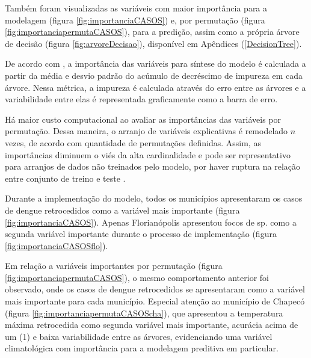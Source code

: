 \indent Também foram visualizadas as variáveis com maior importância para a modelagem (figura \ref{fig:importanciaCASOS}) e, por permutação (figura \ref{fig:importanciapermutaCASOS}), para a predição, assim como a própria árvore de decisão (figura \ref{fig:arvoreDecisao}), disponível em Apêndices (\ref{DecisionTree}).

\indent  De acordo com , a importância das variáveis para síntese do modelo  é calculada a partir da média e desvio padrão do acúmulo de decréscimo de impureza em cada árvore. Nessa métrica, a impureza é calculada através do erro entre as árvores e a variabilidade entre elas é representada graficamente como a barra de erro.

\indent Há maior custo computacional ao avaliar as importâncias das variáveis por permutação. Dessa maneira, o arranjo de variáveis explicativas é remodelado $n$ vezes, de acordo com quantidade de permutações definidas. Assim, as importâncias diminuem o viés da alta cardinalidade e pode ser representativo para arranjos de dados não treinados pelo modelo, por haver ruptura na relação entre conjunto de treino e teste \cite{sklearn_2013_buitinck}.

\indent Durante a implementação do modelo, todos os municípios apresentaram os casos de dengue retrocedidos como a variável mais importante (figura \ref{fig:importanciaCASOS}). Apenas Florianópolis apresentou focos de  sp. como a segunda variável importante durante o processo de implementação (figura \ref{fig:importanciaCASOSflo}).

\indent Em relação a variáveis importantes por permutação (figura \ref{fig:importanciapermutaCASOS}), o mesmo comportamento anterior foi observado, onde os casos de dengue retrocedidos se apresentaram como a variável mais importante para cada município. Especial atenção ao município de Chapecó (figura \ref{fig:importanciapermutaCASOScha}), que apresentou a temperatura máxima retrocedida como segunda variável mais importante, acurácia acima de um (1) e baixa variabilidade entre as árvores, evidenciando uma variável climatológica com importância para a modelagem preditiva em particular.


